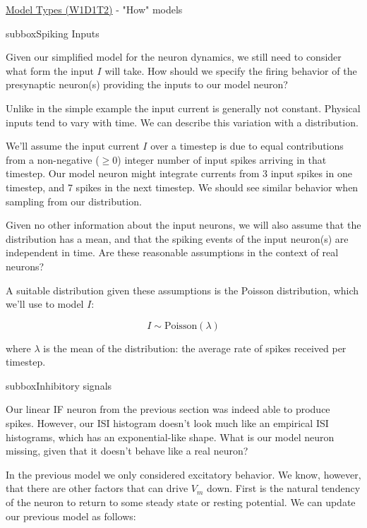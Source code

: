 \begin{textbox}{\href{https://compneuro.neuromatch.io/tutorials/W1D1_ModelTypes/student/W1D1_Tutorial2.html}{Model Types (W1D1T2)} -  "How" models}

\begin{subbox}{subbox}{Spiking Inputs}
\scriptsize

Given our simplified model for the neuron dynamics, we still need to consider what form the input $I$ will take. How should we specify the firing behavior of the presynaptic neuron(s) providing the inputs to our model neuron? 

Unlike in the simple example the input current is generally not constant. Physical inputs tend to vary with time. We can describe this variation with a distribution.

We'll assume the input current $I$ over a timestep is due to equal contributions from a non-negative ($\ge 0$) integer number of input spikes arriving in that timestep. Our model neuron might integrate currents from 3 input spikes in one timestep, and 7 spikes in the next timestep. We should see similar behavior when sampling from our distribution.

Given no other information about the input neurons, we will also assume that the distribution has a mean, and that the spiking events of the input neuron(s) are independent in time. Are these reasonable assumptions in the context of real neurons?

A suitable distribution given these assumptions is the Poisson distribution, which we'll use to model $I$:

\begin{equation}
I \sim \mathrm{Poisson}(\lambda)
\end{equation}

where $\lambda$ is the mean of the distribution: the average rate of spikes received per timestep.

\end{subbox}
\begin{subbox}{subbox}{Inhibitory signals}
\scriptsize

Our linear IF neuron from the previous section was indeed able to produce spikes. However, our ISI histogram doesn't look much like an empirical ISI histograms, which has an exponential-like shape. What is our model neuron missing, given that it doesn't behave like a real neuron?

In the previous model we only considered excitatory behavior. We know, however, that there are other factors that can drive $V_m$ down. First is the natural tendency of the neuron to return to some steady state or resting potential. We can update our previous model as follows:


\end{subbox}
\end{textbox}
